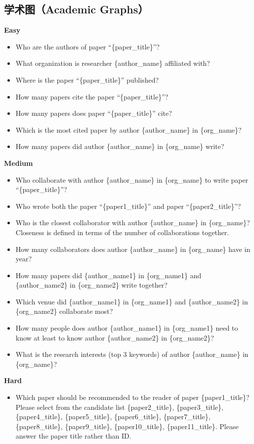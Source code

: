 \documentclass[11pt,UTF8,fontset=fandol]{ctexart}
\begin{document}
\subsection*{学术图（Academic Graphs）}
\noindent\textbf{Easy}
\begin{itemize}[leftmargin=1.4em,nosep]
\item Who are the authors of paper ``\{paper\_title\}''?
\item What organization is researcher \{author\_name\} affiliated with?
\item Where is the paper ``\{paper\_title\}'' published?
\item How many papers cite the paper ``\{paper\_title\}''?
\item How many papers does paper ``\{paper\_title\}'' cite?
\item Which is the most cited paper by author \{author\_name\} in \{org\_name\}?
\item How many papers did author \{author\_name\} in \{org\_name\} write?
\end{itemize}
\noindent\textbf{Medium}
\begin{itemize}[leftmargin=1.4em,nosep]
\item Who collaborate with author \{author\_name\} in \{org\_name\} to write paper ``\{paper\_title\}''?
\item Who wrote both the paper ``\{paper1\_title\}'' and paper ``\{paper2\_title\}''?
\item Who is the closest collaborator with author \{author\_name\} in \{org\_name\}? Closeness is defined in terms of the number of collaborations together.
\item How many collaborators does author \{author\_name\} in \{org\_name\} have in year?
\item How many papers did \{author\_name1\} in \{org\_name1\} and \{author\_name2\} in \{org\_name2\} write together?
\item Which venue did \{author\_name1\} in \{org\_name1\} and \{author\_name2\} in \{org\_name2\} collaborate most?
\item How many people does author \{author\_name1\} in \{org\_name1\} need to know at least to know author \{author\_name2\} in \{org\_name2\}?
\item What is the research interests (top 3 keywords) of author \{author\_name\} in \{org\_name\}?
\end{itemize}
\noindent\textbf{Hard}
\begin{itemize}[leftmargin=1.4em,nosep]
\item Which paper should be recommended to the reader of paper \{paper1\_title\}? Please select from the candidate list \{paper2\_title\}, \{paper3\_title\}, \{paper4\_title\}, \{paper5\_title\}, \{paper6\_title\}, \{paper7\_title\}, \{paper8\_title\}, \{paper9\_title\}, \{paper10\_title\}, \{paper11\_title\}. Please answer the paper title rather than ID.
\end{itemize}
\end{document}
